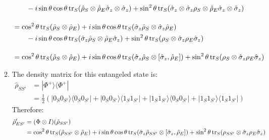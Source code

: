 \documentclass[12pt,a4]{article}
\begin{document}
\begin{enumerate}
\begin{enumerate}
\begin{align*}
                       & \qquad - i \sin \theta \cos \theta \tr_S(\hat \rho_S \otimes \hat \rho_E \hat\sigma_z \otimes \hat \sigma_z) + \sin^2 \theta \tr_S( \hat\sigma_z \otimes \hat \sigma_z \rho_S \otimes \hat \rho_E \hat\sigma_z \otimes \hat \sigma_z)\\[10pt]
                       &= \cos^2 \theta\tr_S( \hat \rho_S \otimes \hat \rho_E ) + i \sin \theta \cos \theta \tr_S( \hat\sigma_z \hat \rho_S \otimes \hat \sigma_z \hat \rho_E)\\
                       & \qquad - i \sin \theta \cos \theta \tr_S(\hat \sigma_z\hat \rho_S \otimes \hat \rho_E \hat \sigma_z) + \sin^2 \theta \tr_S(\rho_S \otimes \hat \sigma_z \rho_E  \hat \sigma_z)\\[10pt]
                       &= \cos^2 \theta\tr_S( \hat \rho_S \otimes \hat \rho_E ) + i \sin \theta \cos \theta \tr_S( \hat\sigma_z \hat \rho_S \otimes [\hat \sigma_z, \hat \rho_E])  + \sin^2 \theta \tr_S(\rho_S \otimes \hat \sigma_z \rho_E  \hat \sigma_z)
      \end{align*}
    \item
      The density matrix for this entangeled state is:
      \begin{align*}
        \hat \rho_{SS'} &= |\Phi^+\rangle\langle\Phi^+|\\
                        &= \frac{1}{2}\left(|0_S0_{S'}\rangle\langle 0_S0_{S'}| + |0_S0_{S'}\rangle\langle 1_S1_{S'}| + |1_S1_{S'}\rangle\langle 0_S0_{S'}| + |1_S1_{S'}\rangle\langle 1_S1_{S'}|\right)
      \end{align*}
      Therefore:
      \begin{align*}
        \hat \rho'_{ES'} &= (\Phi \otimes I) (\hat \rho_{SS'})\\
                         &= \cos^2 \theta\tr_S( \hat \rho_{SS'} \otimes \hat \rho_E ) + i \sin \theta \cos \theta \tr_S( \hat\sigma_z \hat \rho_{SS'} \otimes [\hat \sigma_z, \hat \rho_E])  + \sin^2 \theta \tr_S(\rho_{SS'} \otimes \hat \sigma_z \rho_E  \hat \sigma_z)
      \end{align*}

\end{enumerate}
\end{enumerate}
\end{document}

